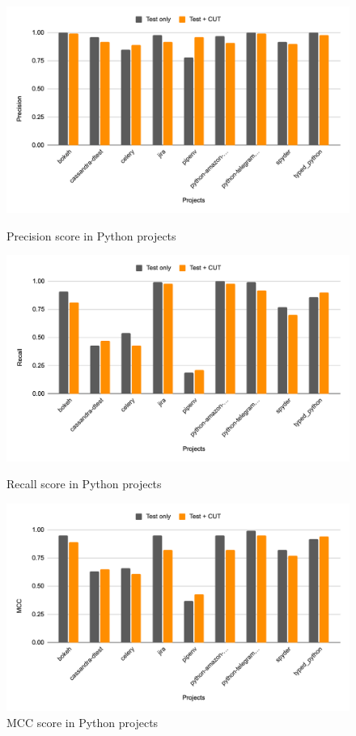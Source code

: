 \begin{figure}[!tbp]
  \centering
  \begin{minipage}[b]{0.4\textwidth}
    \includegraphics[width=\textwidth]{figures/replication/RQ3PythonPrecision.png}
    \caption{Precision score in Python projects}
    \label{fig:prec-python-cut}
  \end{minipage}
  \hfill
  \begin{minipage}[b]{0.4\textwidth}
    \includegraphics[width=\textwidth]{figures/replication/RQ3PythonRecall.png}
    \caption{Recall score in Python projects}
    \label{fig:rec-python-cut}
  \end{minipage}
  \hfill
  \begin{minipage}[b]{0.4\textwidth}
    \includegraphics[width=\textwidth]{figures/replication/RQ3PythonMCC.png}
    \caption{MCC score in Python projects}
    \label{fig:mcc-python-cut}
  \end{minipage}
\end{figure}


